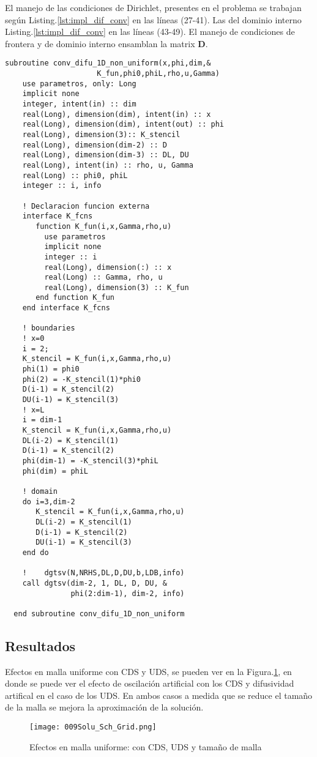 \documentclass[9pt,technote,twoside,letterpaper,onecolumn]{IEEEtran}
\begin{document}
\begin{multicols}{2}
El manejo de las condiciones de Dirichlet, presentes en el problema se trabajan según Listing.\ref{lst:impl_dif_conv} en las líneas (27-41). Las del dominio interno Listing.\ref{lst:impl_dif_conv} en las líneas (43-49). El manejo de condiciones de frontera y de dominio interno ensamblan la matrix $\mathbf{D}$.

\begin{lstlisting}[caption={Algoritmo solución Difusión-Convección estacionario},label={lst:impl_dif_conv}]
  subroutine conv_difu_1D_non_uniform(x,phi,dim,&
                     K_fun,phi0,phiL,rho,u,Gamma)
    use parametros, only: Long        
    implicit none
    integer, intent(in) :: dim
    real(Long), dimension(dim), intent(in) :: x
    real(Long), dimension(dim), intent(out) :: phi
    real(Long), dimension(3):: K_stencil
    real(Long), dimension(dim-2) :: D
    real(Long), dimension(dim-3) :: DL, DU
    real(Long), intent(in) :: rho, u, Gamma
    real(Long) :: phi0, phiL
    integer :: i, info

    ! Declaracion funcion externa
    interface K_fcns
       function K_fun(i,x,Gamma,rho,u)
         use parametros
         implicit none
         integer :: i
         real(Long), dimension(:) :: x
         real(Long) :: Gamma, rho, u
         real(Long), dimension(3) :: K_fun
       end function K_fun
    end interface K_fcns

    ! boundaries
    ! x=0
    i = 2;
    K_stencil = K_fun(i,x,Gamma,rho,u)
    phi(1) = phi0
    phi(2) = -K_stencil(1)*phi0
    D(i-1) = K_stencil(2)
    DU(i-1) = K_stencil(3)
    ! x=L
    i = dim-1
    K_stencil = K_fun(i,x,Gamma,rho,u)
    DL(i-2) = K_stencil(1)
    D(i-1) = K_stencil(2)
    phi(dim-1) = -K_stencil(3)*phiL
    phi(dim) = phiL
    
    ! domain
    do i=3,dim-2
       K_stencil = K_fun(i,x,Gamma,rho,u)
       DL(i-2) = K_stencil(1)
       D(i-1) = K_stencil(2)
       DU(i-1) = K_stencil(3)        
    end do
    
    !    dgtsv(N,NRHS,DL,D,DU,b,LDB,info)
    call dgtsv(dim-2, 1, DL, D, DU, &
               phi(2:dim-1), dim-2, info)

  end subroutine conv_difu_1D_non_uniform
\end{lstlisting}

\subsection{Resultados}
\label{sec:res_sol_con_dif}

Efectos en malla uniforme con CDS y UDS, se pueden ver en la Figura.\ref{fig:sch_grid}, en donde se puede ver el efecto de oscilación artificial con los CDS y difusividad artifical en el caso de los UDS. En ambos casos a medida que se reduce el tamaño de la malla se mejora la aproximación de la solución.
\begin{figure}[H]
  \centering
  \texttt{[image: 009Solu\_Sch\_Grid.png]}\\
  \label{fig:sch_grid}
  \caption{Efectos en malla uniforme: con CDS, UDS y tamaño de malla}
\end{figure}


\end{multicols}
\end{document}
